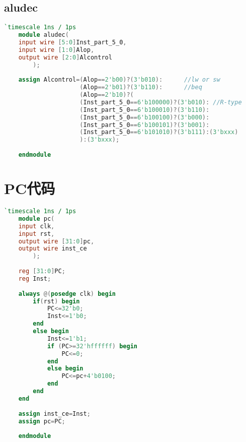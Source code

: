 \subsection{aludec}
\begin{lstlisting}[language=Verilog]
    `timescale 1ns / 1ps
    module aludec(
    input wire [5:0]Inst_part_5_0,
    input wire [1:0]Alop,
    output wire [2:0]Alcontrol
        );
    
    assign Alcontrol=(Alop==2'b00)?(3'b010):      //lw or sw
                     (Alop==2'b01)?(3'b110):      //beq
                     (Alop==2'b10)?(
                     (Inst_part_5_0==6'b100000)?(3'b010): //R-type
                     (Inst_part_5_0==6'b100010)?(3'b110):
                     (Inst_part_5_0==6'b100100)?(3'b000):
                     (Inst_part_5_0==6'b100101)?(3'b001):
                     (Inst_part_5_0==6'b101010)?(3'b111):(3'bxxx)
                     ):(3'bxxx);
    
    endmodule
\end{lstlisting}

\section{PC代码}
\begin{lstlisting}[language=Verilog]
    `timescale 1ns / 1ps
    module pc(
    input clk,
    input rst,
    output wire [31:0]pc,
    output wire inst_ce
        );
    
    reg [31:0]PC;
    reg Inst;
    
    always @(posedge clk) begin
        if(rst) begin
            PC<=32'b0;
            Inst<=1'b0;
        end
        else begin
            Inst<=1'b1;
            if (PC>=32'hffffff) begin
                PC<=0;
            end
            else begin
                PC<=pc+4'b0100;
            end
        end
    end
    
    assign inst_ce=Inst;
    assign pc=PC;
    
    endmodule    
\end{lstlisting}

